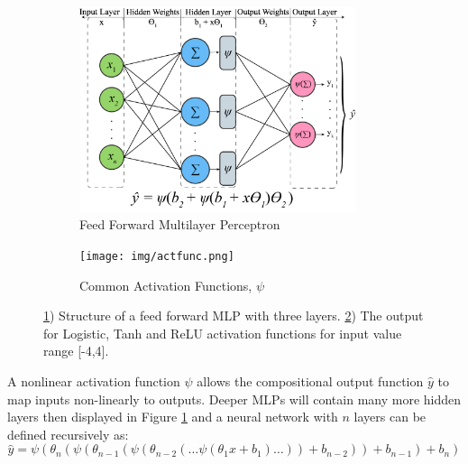\begin{figure}[h!]
    \centering
    \begin{subfigure}[b]{0.59\textwidth}
        \includegraphics[height = 6cm, width=\textwidth]{img/mlp.png}
        \caption{Feed Forward Multilayer Perceptron}
        \label{fig:mlp}
    \end{subfigure}
    \hfill
    \begin{subfigure}[b]{0.40\textwidth}
        \texttt{[image: img/actfunc.png]}
        \caption{Common Activation Functions, $\psi$}
        \label{fig:actfunc}
    \end{subfigure}
    \caption{\ref{fig:mlp}) Structure of a feed forward MLP with three layers. \ref{fig:actfunc}) The output for Logistic, Tanh and ReLU activation functions for input value range [-4,4].}\label{fig:mlp_actfunc}
\end{figure}
% 

A nonlinear activation function $\psi$ allows the compositional output function $ \hat{y}$ to map inputs non-linearly to outputs. Deeper MLPs will contain many more hidden layers then displayed in Figure \ref{fig:mlp} and a neural network with $n$ layers can be defined recursively as:
\begin{equation}
        \hat{y} = \psi(\theta_{n}(\psi(\theta_{n-1}(\psi(\theta_{n-2}(\ldots \psi(\theta_{1} x + b_{1}) \ldots)) + b_{n-2})) + b_{n-1}) + b_{n}) 
\end{equation}

